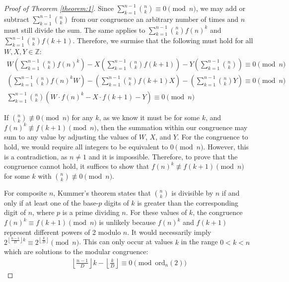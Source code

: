 \documentclass{article}
\theoremstyle{plain}
\theoremstyle{definition}
\begin{document}
\begin{proof}[Proof of Theorem \ref{theorem:1}]
Since $\sum_{k=1}^{n-1} \binom{n}{k} \equiv 0 \pmod{n}$, we may add or subtract $\sum_{k=1}^{n-1} \binom{n}{k}$ from our congruence an arbitrary number of times and $n$ must still divide the sum. The same applies to $\sum_{k=1}^{n-1} \binom{n}{k} f(n)^k$ and $\sum_{k=1}^{n-1} \binom{n}{k} f(k+1)$. Therefore, we surmise that the following must hold for all $W,X,Y \in \mathbb{Z}$:
\begin{align}
W \left(\sum_{k=1}^{n-1} \binom{n}{k} f(n)^k\right) - X \left(\sum_{k=1}^{n-1} \binom{n}{k} f(k+1)\right) - Y \left(\sum_{k=1}^{n-1} \binom{n}{k}\right) \equiv 0 \pmod{n} \\
\left(\sum_{k=1}^{n-1} \binom{n}{k} f(n)^k W\right) - \left(\sum_{k=1}^{n-1} \binom{n}{k} f(k+1) X\right) - \left(\sum_{k=1}^{n-1} \binom{n}{k} Y\right) \equiv 0 \pmod{n} \\
\sum_{k=1}^{n-1} \binom{n}{k} \left( W \cdot f(n)^k - X \cdot f(k+1) - Y\right) \equiv 0 \pmod{n}
\end{align}

If $\binom{n}{k} \not\equiv 0 \pmod{n}$ for any $k$, as we know it must be for some $k$, and $f(n)^k \not\equiv f(k+1) \pmod{n}$, then the summation within our congruence may sum to any value by adjusting the values of $W$, $X$, and $Y$. For the congruence to hold, we would require all integers to be equivalent to $0 \pmod{n}$. However, this is a contradiction, as $n\not=1$ and it is impossible. Therefore, to prove that the congruence cannot hold, it suffices to show that $f(n)^k \not\equiv f(k+1) \pmod{n}$ for some $k$ with $\binom{n}{k} \not\equiv 0 \pmod{n}$.

For composite \( n \), Kummer's theorem \cite{kummer1857} states that \( \binom{n}{k} \) is divisible by \( n \) if and only if at least one of the base-\( p \) digits of \( k \) is greater than the corresponding digit of \( n \), where \( p \) is a prime dividing \( n \). For these values of \( k \), the congruence \( f(n)^k \equiv f(k+1) \pmod{n} \) is unlikely because \( f(n)^k \) and \( f(k+1) \) represent different powers of 2 modulo \( n \). It would necessarily imply $2^{\left\lfloor \frac{n-1}{D} \right\rfloor k} \equiv 2^{\left\lfloor \frac{k}{D} \right\rfloor} \pmod{n}$. This can only occur at values $k$ in the range $0 < k < n$ which are solutions to the modular congruence:
\begin{align}
    \left\lfloor \frac{n-1}{D} \right\rfloor k - \left\lfloor \frac{k}{D} \right\rfloor \equiv 0 \pmod{\text{ord}_n(2)}
\end{align}


\end{proof}
\end{document}
